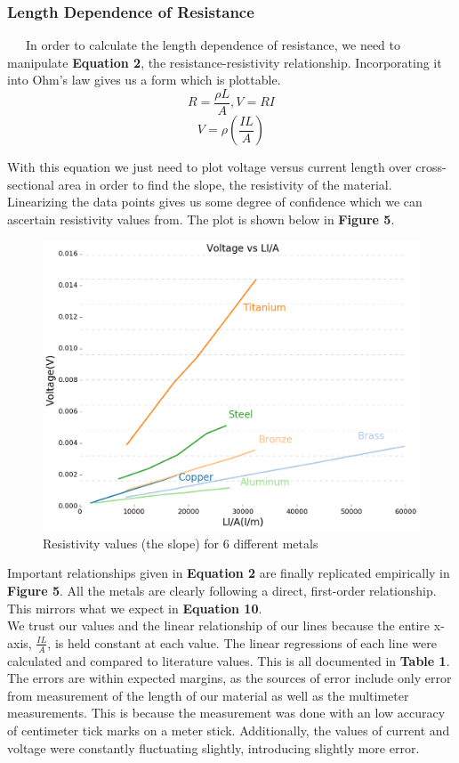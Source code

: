 \documentclass[11pt]{article}
\begin{document}
\subsubsection*{Length Dependence of Resistance}
\ \ \ In order to calculate the length dependence of resistance, we need to manipulate \textbf{Equation 2}, the resistance-resistivity relationship. Incorporating it into Ohm's law gives us a form which is plottable.
$$R = \frac{\rho L}{A}, V = RI$$
\begin{equation}
V = \rho \left(\frac{IL}{A}\right)
\end{equation}

With this equation we just need to plot voltage versus current length over cross-sectional area in order to find the slope, the resistivity of the material. Linearizing the data points gives us some degree of confidence which we can ascertain resistivity values from. The plot is shown below in \textbf{Figure 5}.

\begin{figure}[h]
	\centering
	\includegraphics[scale=0.35]{resistivity.png}
	\caption{Resistivity values (the slope) for 6 different metals}
\end{figure}

Important relationships given in \textbf{Equation 2} are finally replicated empirically in \textbf{Figure 5}. All the metals are clearly following a direct, first-order relationship. This mirrors what we expect in \textbf{Equation 10}.\\

We trust our values and the linear relationship of our lines because the entire x-axis, $\frac{IL}{A}$, is held constant at each value. The linear regressions of each line were calculated and compared to literature values. This is all documented in \textbf{Table 1}. The errors are within expected margins, as the sources of error include only error from measurement of the length of our material as well as the multimeter measurements. This is because the measurement was done with an low accuracy of centimeter tick marks on a meter stick. Additionally, the values of current and voltage were constantly fluctuating slightly, introducing slightly more error.
\end{document}
